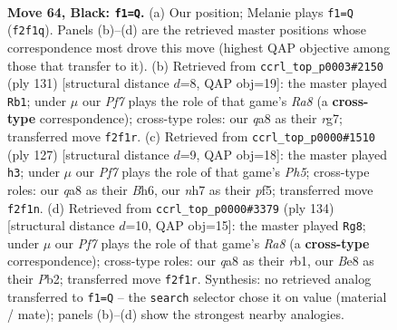 \documentclass[11pt]{article}
\begin{document}
\clearpage

\begin{figure}[p]\centering
\begin{subfigure}{0.46\textwidth}\centering
\resizebox{\linewidth}{!}{%
\newchessgame
\chessboard[
  setfen={Q3b3/6KN/8/2k5/8/8/5p2/8 b - - 0 64},
  showmover=false,
  pgfstyle=straightmove, color=movearrow, markmove={f2-f1}
]}
\caption{}
\end{subfigure}\hfill
\begin{subfigure}{0.46\textwidth}\centering
\resizebox{\linewidth}{!}{%
\newchessgame
\chessboard[
  setfen={8/1b4R1/4k3/8/8/3NK3/8/r7 b - - 4 66},
  showmover=false,
  pgfstyle=straightmove, color=movearrow, markmove={a1-b1}
]}
\caption{}
\end{subfigure}
\\[4pt]
\begin{subfigure}{0.46\textwidth}\centering
\resizebox{\linewidth}{!}{%
\newchessgame
\chessboard[
  setfen={8/8/7b/5P2/7p/8/3N2k1/4K3 b - - 9 64},
  showmover=false,
  pgfstyle=straightmove, color=movearrow, markmove={h4-h3}
]}
\caption{}
\end{subfigure}\hfill
\begin{subfigure}{0.46\textwidth}\centering
\resizebox{\linewidth}{!}{%
\newchessgame
\chessboard[
  setfen={R7/8/4n3/4k3/8/4K3/1P6/1r6 w - - 18 68},
  showmover=false,
  pgfstyle=straightmove, color=movearrow, markmove={a8-g8}
]}
\caption{}
\end{subfigure}
\caption{\textbf{Move 64, Black: \texttt{f1=Q}.} (a) Our position; Melanie plays \texttt{f1=Q} (\texttt{f2f1q}). Panels (b)--(d) are the retrieved master positions whose correspondence most drove this move (highest QAP objective among those that transfer to it). (b) Retrieved from \texttt{ccrl\_top\_p0003\#2150} (ply 131) [structural distance $d$=8, QAP obj=19]: the master played \texttt{Rb1}; under $\mu$ our \emph{Pf7} plays the role of that game's \emph{Ra8} (a \textbf{cross-type} correspondence); cross-type roles: our \emph{q}a8 as their \emph{r}g7; transferred move \texttt{f2f1r}. (c) Retrieved from \texttt{ccrl\_top\_p0000\#1510} (ply 127) [structural distance $d$=9, QAP obj=18]: the master played \texttt{h3}; under $\mu$ our \emph{Pf7} plays the role of that game's \emph{Ph5}; cross-type roles: our \emph{q}a8 as their \emph{B}h6, our \emph{n}h7 as their \emph{p}f5; transferred move \texttt{f2f1n}. (d) Retrieved from \texttt{ccrl\_top\_p0000\#3379} (ply 134) [structural distance $d$=10, QAP obj=15]: the master played \texttt{Rg8}; under $\mu$ our \emph{Pf7} plays the role of that game's \emph{Ra8} (a \textbf{cross-type} correspondence); cross-type roles: our \emph{q}a8 as their \emph{r}b1, our \emph{B}e8 as their \emph{P}b2; transferred move \texttt{f2f1r}. Synthesis: no retrieved analog transferred to \texttt{f1=Q} -- the \texttt{search} selector chose it on value (material / mate); panels (b)--(d) show the strongest nearby analogies.}
\label{fig:thought-m127}
\end{figure}
\end{document}
